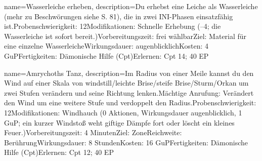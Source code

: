 {
    name={Wasserleiche erheben},
    description={Du erhebst eine Leiche als Wasserleiche (mehr zu Beschwörungen siehe S. 81), die in zwei INI-Phasen einsatzfähig ist.\newline Probenschwierigkeit: 12\newline Modifikationen: Schnelle Erhebung (–4; die Wasserleiche ist sofort bereit.)\newline Vorbereitungszeit: frei wählbar\newline Ziel: Material für eine einzelne Wasserleiche\newline Wirkungsdauer: augenblicklich\newline Kosten: 4 GuP\newline Fertigkeiten: Dämonische Hilfe (Cpt)\newline Erlernen: Cpt 14; 40 EP}
}


{
    name={Amrychoths Tanz},
    description={Im Radius von einer Meile kannst du den Wind auf einer Skala von windstill/leichte Brise/steife Brise/Sturm/Orkan um zwei Stufen verändern und seine Richtung lenken.\newline Mächtige Anrufung: Verändert den Wind um eine weitere Stufe und verdoppelt den Radius.\newline Probenschwierigkeit: 12\newline Modifikationen: Windhauch (0 Aktionen, Wirkungsdauer augenblicklich, 1 GuP; ein kurzer Windstoß weht giftige Dämpfe fort oder löscht ein kleines Feuer.)\newline Vorbereitungszeit: 4 Minuten\newline Ziel: Zone\newline Reichweite: Berührung\newline Wirkungsdauer: 8 Stunden\newline Kosten: 16 GuP\newline Fertigkeiten: Dämonische Hilfe (Cpt)\newline Erlernen: Cpt 12; 40 EP}
}


